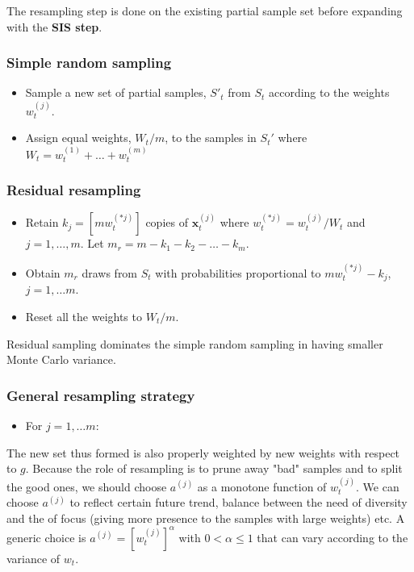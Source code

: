 \documentclass[times, utf8, diplomski]{fer}
\begin{document}
The resampling step is done on the existing partial sample set before expanding with the \textbf{SIS step}.

\subsubsection{Simple random sampling}
\begin{itemize}
\item{Sample a new set of partial samples, $S'_t$ from $S_t$ according to the weights $w_t^{(j)}$.}
\item{Assign equal weights, $W_t / m$, to the samples in $S_t'$ where $W_t = w_t^{(1)} + \ldots + w_t^{(m)}$}
\end{itemize}

\subsubsection{Residual resampling}
\begin{itemize}
\item{Retain $k_j = [mw_t^{(*j)}]$ copies of $\mathbf{x}_t^{(j)}$ where $w_t^{(*j)} = w_t^{(j)} / W_t$ and $j = 1, \ldots, m$. Let $m_r = m - k_1 - k_2 - \ldots - k_m$.}
\item{Obtain $m_r$ draws from $S_t$ with probabilities proportional to $mw_t^{(*j)} - k_j$, $j = 1, \ldots m$.}
\item{Reset all the weights to $W_t / m$.}
\end{itemize}

Residual sampling dominates the simple random sampling in having smaller Monte Carlo variance. 

\subsubsection{General resampling strategy}
\begin{itemize}
\item{For $j = 1, \ldots m$:
}
\end{itemize}
The new set thus formed is also properly weighted by new weights with respect to $g$. Because the role of resampling is to prune away "bad" samples and to split the good ones, we should choose $a^{(j)}$ as a monotone function of $w_t^{(j)}$. We can choose $a^{(j)}$ to reflect certain future trend, balance between the need of diversity and the of focus (giving more presence to the samples with large weights) etc.  A generic choice is $a^{(j)} = [w_t^{(j)}]^{\alpha}$ with $0 < \alpha \leq 1$ that can vary according to the variance of $w_t$.
\end{document}

